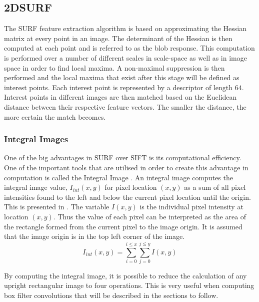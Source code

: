 \documentclass[11pt]{report}
\begin{document}
\subsection{2DSURF}
\label{sec:2dsurf}
The SURF feature extraction algorithm is based on approximating the Hessian matrix at every point in an image. The determinant of the Hessian is then computed at each point and is referred to as the blob response. This computation is performed over a number of different scales in scale-space as well as in image space in order to find local maxima. A non-maximal suppression is then performed and the local maxima that exist after this stage will be defined as interest points. Each interest point is represented by a descriptor of length $64$. Interest points in different images are then matched based on the Euclidean distance between their respective feature vectors. The smaller the distance, the more certain the match becomes. 

\subsubsection{Integral Images}
\label{sec:integralImages}
One of the big advantages in SURF over SIFT \cite{Lowe2004} is its computational efficiency. One of the important tools that are utilised in order to create this advantage in computation is called the Integral Image \cite{Bay2008}. An integral image computes the integral image value, $I_{int}(x,y)$ for pixel location $(x,y)$  as a sum of all pixel intensities found to the left and below the current pixel location until the origin. This is presented in . The variable $I(x,y)$ is the individual pixel intensity at location $(x,y)$. Thus the value of each pixel can be interpreted as the area of the rectangle formed from the current pixel to the image origin. It is assumed that the image origin is in the top left corner of the image. \\

\begin{equation}
I_{int}(x,y) = \sum_{i=0}^{i \leq x}\sum_{j=0}^{j \leq y}I(x,y)
\label{eqn:integralImage}
\end{equation}

By computing the integral image, it is possible to reduce the calculation of any upright rectangular image to four operations. This is very useful when computing box filter convolutions that will be described in the sections to follow.\\
\end{document}
